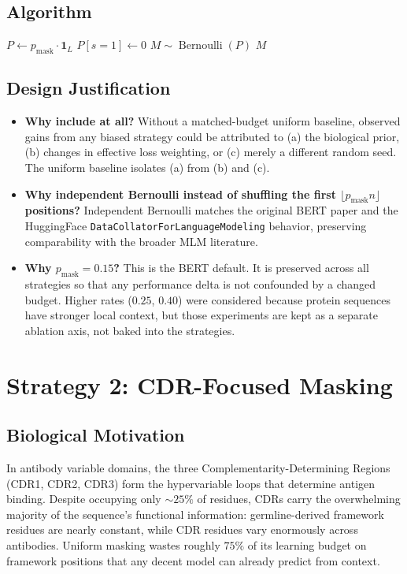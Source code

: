 \documentclass[11pt]{article}
\newcommand{\pmask}{p_{\text{mask}}}
\DeclareMathOperator{\Bern}{Bernoulli}
\begin{document}
\subsection{Algorithm}
\begin{algorithm}[H]
\caption{Uniform Masking}
\begin{algorithmic}[1]
\State $P \gets \pmask \cdot \mathbf{1}_L$
\State $P[s = 1] \gets 0$
\State $M \sim \Bern(P)$
\State \Return $M$
\end{algorithmic}
\end{algorithm}

\subsection{Design Justification}
\begin{itemize}
\item \textbf{Why include at all?} Without a matched-budget uniform
baseline, observed gains from any biased strategy could be attributed
to (a) the biological prior, (b) changes in effective loss weighting, or
(c) merely a different random seed. The uniform baseline isolates
(a) from (b) and (c).
\item \textbf{Why independent Bernoulli instead of shuffling the first
$\lfloor \pmask n \rfloor$ positions?} Independent Bernoulli matches the
original BERT paper and the HuggingFace \texttt{DataCollatorForLanguageModeling}
behavior, preserving comparability with the broader MLM literature.
\item \textbf{Why $\pmask = 0.15$?} This is the BERT default. It is
preserved across all strategies so that any performance delta is not
confounded by a changed budget. Higher rates ($0.25$, $0.40$) were
considered because protein sequences have stronger local context, but
those experiments are kept as a separate ablation axis, not baked into
the strategies.
\end{itemize}

\section{Strategy 2: CDR-Focused Masking}

\subsection{Biological Motivation}
In antibody variable domains, the three Complementarity-Determining
Regions (CDR1, CDR2, CDR3) form the hypervariable loops that determine
antigen binding. Despite occupying only $\sim 25\%$ of residues, CDRs
carry the overwhelming majority of the sequence's functional information:
germline-derived framework residues are nearly constant, while CDR
residues vary enormously across antibodies. Uniform masking wastes
roughly $75\%$ of its learning budget on framework positions that any
decent model can already predict from context.
\end{document}
